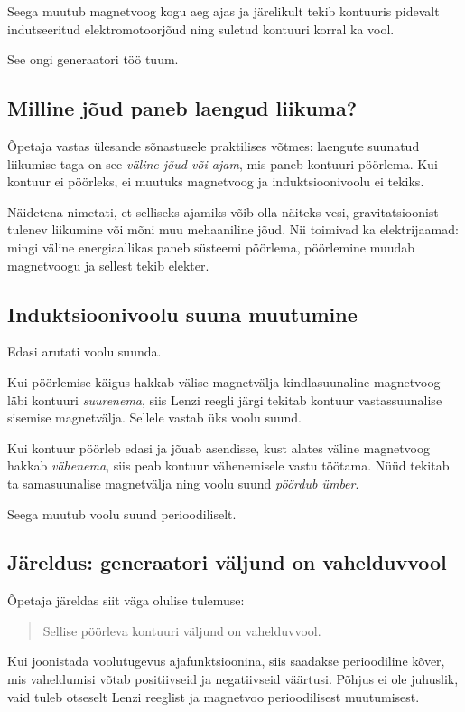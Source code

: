 \documentclass[a4paper,11pt]{article}
\begin{document}
Seega muutub magnetvoog kogu aeg ajas ja järelikult tekib kontuuris pidevalt indutseeritud elektromotoorjõud ning suletud kontuuri korral ka vool.

See ongi generaatori töö tuum.

\subsection{Milline jõud paneb laengud liikuma?}

Õpetaja vastas ülesande sõnastusele praktilises võtmes: laengute suunatud liikumise taga on see \emph{väline jõud või ajam}, mis paneb kontuuri pöörlema. Kui kontuur ei pöörleks, ei muutuks magnetvoog ja induktsioonivoolu ei tekiks.

Näidetena nimetati, et selliseks ajamiks võib olla näiteks vesi, gravitatsioonist tulenev liikumine või mõni muu mehaaniline jõud. Nii toimivad ka elektrijaamad: mingi väline energiaallikas paneb süsteemi pöörlema, pöörlemine muudab magnetvoogu ja sellest tekib elekter.

\subsection{Induktsioonivoolu suuna muutumine}

Edasi arutati voolu suunda.

Kui pöörlemise käigus hakkab välise magnetvälja kindlasuunaline magnetvoog läbi kontuuri \emph{suurenema}, siis Lenzi reegli järgi tekitab kontuur vastassuunalise sisemise magnetvälja. Sellele vastab üks voolu suund.

Kui kontuur pöörleb edasi ja jõuab asendisse, kust alates väline magnetvoog hakkab \emph{vähenema}, siis peab kontuur vähenemisele vastu töötama. Nüüd tekitab ta samasuunalise magnetvälja ning voolu suund \emph{pöördub ümber}.

Seega muutub voolu suund perioodiliselt.

\subsection{Järeldus: generaatori väljund on vahelduvvool}

Õpetaja järeldas siit väga olulise tulemuse:

\begin{quote}
Sellise pöörleva kontuuri väljund on vahelduvvool.
\end{quote}

Kui joonistada voolutugevus ajafunktsioonina, siis saadakse perioodiline kõver, mis vaheldumisi võtab positiivseid ja negatiivseid väärtusi. Põhjus ei ole juhuslik, vaid tuleb otseselt Lenzi reeglist ja magnetvoo perioodilisest muutumisest.
\end{document}
